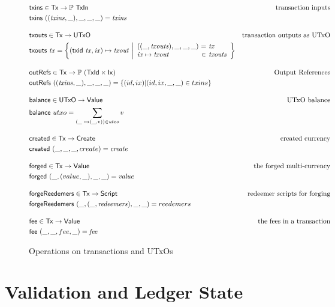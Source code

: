 \documentclass[11pt,a4paper]{article}
\newcommand{\powerset}[1]{\mathbb{P}~#1}
\newcommand{\var}[1]{\mathit{#1}}
\newcommand{\fun}[1]{\mathsf{#1}}
\newcommand{\type}[1]{\mathsf{#1}}
\newcommand{\Script}{\type{Script}}
\newcommand{\TxId}{\type{TxId}}
\newcommand{\Ix}{\type{Ix}}
\newcommand{\Value}{\type{Value}}
\newcommand{\TxIn}{\type{TxIn}}
\newcommand{\UTxO}{\type{UTxO}}
\newcommand{\Create}{\type{Create}}
\newcommand{\Tx}{\type{Tx}}
\begin{document}
\begin{figure}
\begin{align*}
& \fun{txins} \in \Tx \to \powerset{\TxIn}
& \text{transaction inputs} \\
& \fun{txins} ~ ((\var{txins}, \_), \_, \_, \_) = \var{txins}
\\[1em]
& \fun{txouts} \in \Tx \to \UTxO
& \text{transaction outputs as UTxO} \\
& \fun{txouts} ~ \var{tx} =
  \left\{ (\fun{txid} ~ \var{tx}, \var{ix}) \mapsto \var{txout} ~
  \middle| \begin{array}{l@{~}c@{~}l}
             ((\_, \var{txouts}),\_, \_, \_) & = & \var{tx} \\
             \var{ix} \mapsto \var{txout} & \in & \var{txouts}
           \end{array}
  \right\}
\\[1em]
& \fun{outRefs} \in \Tx \to \powerset({\TxId \times \Ix})
& \text{Output References} \\
& \fun{outRefs} ~ ((\var{txins}, \_), \_, \_, \_)
= \left\{ (id, ix) \middle| (id, ix, \_, \_) \in txins\right\}
\\[1em]
& \fun{balance} \in \UTxO \to \Value
& \text{UTxO balance} \\
& \fun{balance} ~ utxo = \sum_{(\_ ~ \mapsto (\_, v)) \in \var{utxo}} v
\\[1em]
& \fun{created} \in \Tx \to \Create
& \text{created currency} \\
& \fun{created} ~ (\_, \_, \_, create) = \var{create}
\\[1em]
& \fun{forged} \in \Tx \to \Value
& \text{the forged multi-currency} \\
& \fun{forged} ~ (\_, (value, \_), \_, \_) = \var{value}
\\[1em]
& \fun{forgeReedemers} \in \Tx \to \Script
& \text{redeemer scripts for forging} \\
& \fun{forgeReedemers} ~ ( \_, (\_, \var{redeemers}), \_, \_) = reedemers
\\[1em]
& \fun{fee} \in \Tx \to \Value
& \text{the fees in a transaction} \\
& \fun{fee} ~ (\_, \_, fee, \_) = \var{fee}
\end{align*}
\caption{Operations on transactions and UTxOs}
\label{fig:auxiliary_ops}
\end{figure}

\section{Validation and Ledger State}
\end{document}
